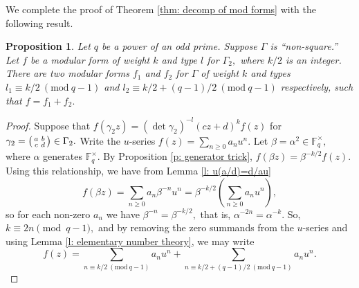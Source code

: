 \documentclass[11pt]{amsart}
\newtheorem{proposition}[theorem]{Proposition}
\theoremstyle{definition}
\newenvironment{psmallmatrix}
{\left(\begin{smallmatrix}}
	{\end{smallmatrix}\right)}
\numberwithin{equation}{section}
\newcommand{\bbF}{\mathbb{F}}		%
\newcommand{\jesse}[1]{{\color{blue} \sf $\spadesuit\spadesuit\spadesuit$ Jesse: [#1]}} %
\newcommand{\Mod}[1]{\ (\mathrm{mod}\ #1)}
\begin{document}
We complete the proof of Theorem \ref{thm: decomp of mod forms} with the following result.
\begin{proposition}
	Let $q$ be a power of an odd prime. Suppose $\Gamma$ is ``non-square.''
	Let $f$ be a modular form of weight $k$ and type $l$ for $\Gamma_2,$ where $k/2$ is an integer. 
	There are two modular forms $f_1$ and $f_2$ for $\Gamma$ of weight $k$ and types $l_1\equiv k/2\Mod{q-1}$ and $l_2\equiv k/2+(q-1)/2\Mod{q-1}$ respectively, such that $f=f_1+f_2.$
\end{proposition}
\begin{proof}
Suppose that $f(\gamma_2 z)=(\det\gamma_2)^{-l}(cz+d)^kf(z)$ for $\displaystyle{\gamma_2=\begin{psmallmatrix}a&b\\c&d\end{psmallmatrix}\in \Gamma_2}.$ 
Write the $u$-series $f(z)=\sum_{n\geq 0}a_nu^n.$ Let $\beta = \alpha^2\in \bbF_q^{\times},$ where $\alpha$ generates $\bbF_q^{\times}.$ By Proposition \ref{p: generator trick}, $f(\beta z)=\beta^{-k/2}f(z).$ Using this relationship, we have from Lemma \ref{l: u(a/d)=d/au}
\[f(\beta z)= \sum_{n\geq 0}a_n\beta^{-n}u^n = \beta^{-k/2}\left(\sum_{n\geq 0}a_nu^n\right), \] so for each non-zero $a_n$ we have $\beta^{-n}=\beta^{-k/2},$ that is, $\alpha^{-2n}=\alpha^{-k}.$ So, $k\equiv 2n\pmod{q-1},$ and by removing the zero summands from the $u$-series and using Lemma \ref{l: elementary number theory}, we may write
\[f(z)=\sum_{n\equiv k/2\Mod{q-1}}a_nu^n+\sum_{n\equiv k/2+(q-1)/2\Mod{q-1}} a_nu^n. \]



\end{proof}
\end{document}
